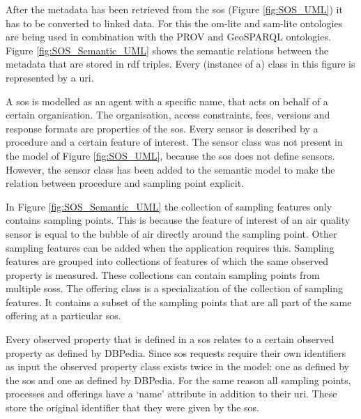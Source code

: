After the metadata has been retrieved from the \ac{sos} (Figure \ref{fig:SOS_UML}) it has to be converted to linked data. For this the om-lite and sam-lite ontologies are being used in combination with the PROV and GeoSPARQL ontologies. Figure \ref{fig:SOS_Semantic_UML} shows the semantic relations between the metadata that are stored in \ac{rdf} triples. Every (instance of a) class in this figure is represented by a \ac{uri}. 

A \ac{sos} is modelled as an agent with a specific name, that acts on behalf of a certain organisation. The organisation, access constraints, fees, versions and response formats are properties of the \ac{sos}. Every sensor is described by a procedure and a certain feature of interest. The sensor class was not present in the model of Figure \ref{fig:SOS_UML}, because the \ac{sos} does not define sensors. However, the sensor class has been added to the semantic model to make the relation between procedure and sampling point explicit. 

In Figure \ref{fig:SOS_Semantic_UML} the collection of sampling features only contains sampling points. This is because the feature of interest of an air quality sensor is equal to the bubble of air directly around the sampling point. Other sampling features can be added when the application requires this. Sampling features are grouped into collections of features of which the same observed property is measured. These collections can contain sampling points from multiple \aclp{sos}. The offering class is a specialization of the collection of sampling features. It contains a subset of the sampling points that are all part of the same offering at a particular \ac{sos}.

Every observed property that is defined in a \ac{sos} relates to a certain observed property as defined by DBPedia. Since \ac{sos} requests require their own identifiers as input the observed property class exists twice in the model: one as defined by the \ac{sos} and one as defined by DBPedia. For the same reason all sampling points, processes and offerings have a `name' attribute in addition to their \ac{uri}. These store the original identifier that they were given by the \ac{sos}.


